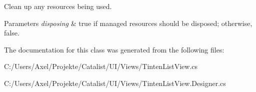 Clean up any resources being used. 


\begin{DoxyParams}{Parameters}
{\em disposing} & true if managed resources should be disposed; otherwise, false.\\
\hline
\end{DoxyParams}


The documentation for this class was generated from the following files\+:\begin{DoxyCompactItemize}
\item 
C\+:/\+Users/\+Axel/\+Projekte/\+Catalist/\+U\+I/\+Views/Tinten\+List\+View.\+cs\item 
C\+:/\+Users/\+Axel/\+Projekte/\+Catalist/\+U\+I/\+Views/Tinten\+List\+View.\+Designer.\+cs\end{DoxyCompactItemize}
